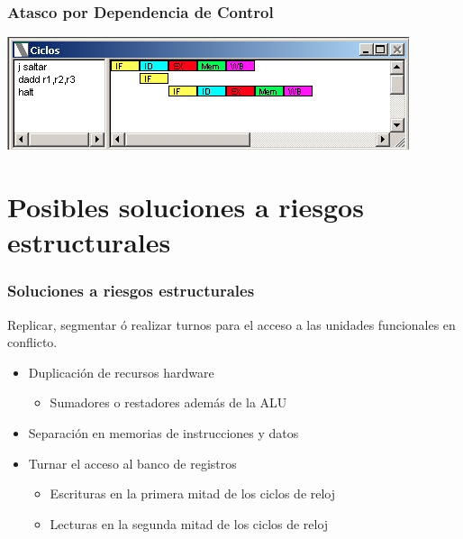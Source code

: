 \documentclass{beamer}
\begin{document}
\begin{frame}[fragile]
\frametitle{Atasco por Dependencia de Control}
\begin{block}{}
\includegraphics[scale=0.45]{atasco-branch-taken.png}
\end{block}
\end{frame}


\section{Posibles soluciones a riesgos estructurales}
\begin{frame}
\frametitle{Soluciones a riesgos estructurales}
Replicar, segmentar ó realizar turnos para el acceso a las unidades funcionales en conflicto.
\begin{itemize}
\item Duplicación de recursos hardware
\begin{itemize}
\item Sumadores o restadores además de la ALU
\end{itemize}
\item Separación en memorias de instrucciones y datos
\item Turnar el acceso al banco de registros
\begin{itemize}
\item Escrituras en la primera mitad de los ciclos de reloj
\item Lecturas en la segunda mitad de los ciclos de reloj
\end{itemize}
\end{itemize}
\end{frame}
\end{document}
